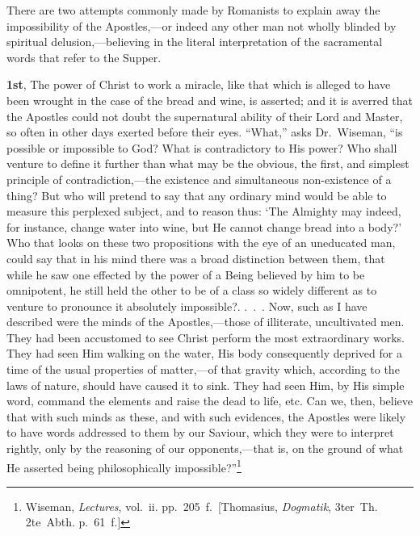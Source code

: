 \documentclass[
]{book}
\begin{document}
There are two attempts commonly made by Romanists to explain away the impossibility of the Apostles,---or indeed any other man not wholly blinded by spiritual delusion,---believing in the literal interpretation of the sacramental words that refer to the Supper.

\textbf{1st}, The power of Christ to work a miracle, like that which is alleged to have been wrought in the case of the bread and wine, is asserted; and it is averred that the Apostles could not doubt the supernatural ability of their Lord and Master, so often in other days exerted before their eyes. ``What,'' asks Dr.~Wiseman, ``is possible or impossible to God? What is contradictory to His power? Who shall venture to define it further than what may be the obvious, the first, and simplest principle of contradiction,---the existence and simultaneous non-existence of a thing? But who will pretend to say that any ordinary mind would be able to measure this perplexed subject, and to reason thus: `The Almighty may indeed, for instance, change water into wine, but He cannot change bread into a body?' Who that looks on these two propositions with the eye of an uneducated man, could say that in his mind there was a broad distinction between them, that while he saw one effected by the power of a Being believed by him to be omnipotent, he still held the other to be of a class so widely different as to venture to pronounce it absolutely impossible?. .~.~. Now, such as I have described were the minds of the Apostles,---those of illiterate, uncultivated men. They had been accustomed to see Christ perform the most extraordinary works. They had seen Him walking on the water, His body consequently deprived for a time of the usual properties of matter,---of that gravity which, according to the laws of nature, should have caused it to sink. They had seen Him, by His simple word, command the elements and raise the dead to life, etc. Can we, then, believe that with such minds as these, and with such evidences, the Apostles were likely to have words addressed to them by our Saviour, which they were to interpret rightly, only by the reasoning of our opponents,---that is, on the ground of what He asserted being philosophically impossible?''\footnote{Wiseman, \emph{Lectures}, vol.~ii. pp.~205~f.~{[}Thomasius, \emph{Dogmatik}, 3ter~Th. 2te~Abth. p.~61~f.{]}}
\end{document}
